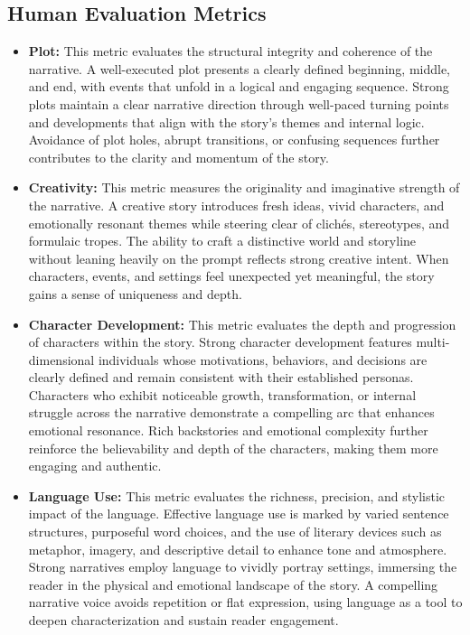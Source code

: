 \documentclass[letterpaper]{article} %
\begin{document}
\subsection{Human Evaluation Metrics}

\begin{itemize}
  \item \textbf{Plot:} This metric evaluates the structural integrity and coherence of the narrative. A well-executed plot presents a clearly defined beginning, middle, and end, with events that unfold in a logical and engaging sequence. Strong plots maintain a clear narrative direction through well-paced turning points and developments that align with the story's themes and internal logic. Avoidance of plot holes, abrupt transitions, or confusing sequences further contributes to the clarity and momentum of the story.

  \item \textbf{Creativity:} This metric measures the originality and imaginative strength of the narrative. A creative story introduces fresh ideas, vivid characters, and emotionally resonant themes while steering clear of clichés, stereotypes, and formulaic tropes. The ability to craft a distinctive world and storyline without leaning heavily on the prompt reflects strong creative intent. When characters, events, and settings feel unexpected yet meaningful, the story gains a sense of uniqueness and depth.
  
  \item \textbf{Character Development:} This metric evaluates the depth and progression of characters within the story. Strong character development features multi-dimensional individuals whose motivations, behaviors, and decisions are clearly defined and remain consistent with their established personas. Characters who exhibit noticeable growth, transformation, or internal struggle across the narrative demonstrate a compelling arc that enhances emotional resonance. Rich backstories and emotional complexity further reinforce the believability and depth of the characters, making them more engaging and authentic.
  
  \item \textbf{Language Use:} This metric evaluates the richness, precision, and stylistic impact of the language. Effective language use is marked by varied sentence structures, purposeful word choices, and the use of literary devices such as metaphor, imagery, and descriptive detail to enhance tone and atmosphere. Strong narratives employ language to vividly portray settings, immersing the reader in the physical and emotional landscape of the story. A compelling narrative voice avoids repetition or flat expression, using language as a tool to deepen characterization and sustain reader engagement.
  

\end{itemize}
\end{document}
